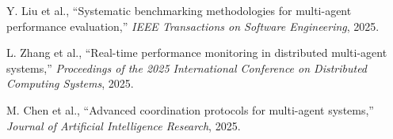 \documentclass[conference]{IEEEtran}
\begin{document}
\begin{thebibliography}{00}
 Y. Liu et al., ``Systematic benchmarking methodologies for multi-agent performance evaluation,'' \emph{IEEE Transactions on Software Engineering}, 2025.

 L. Zhang et al., ``Real-time performance monitoring in distributed multi-agent systems,'' \emph{Proceedings of the 2025 International Conference on Distributed Computing Systems}, 2025.

 M. Chen et al., ``Advanced coordination protocols for multi-agent systems,'' \emph{Journal of Artificial Intelligence Research}, 2025.
\end{thebibliography}
\end{document}

